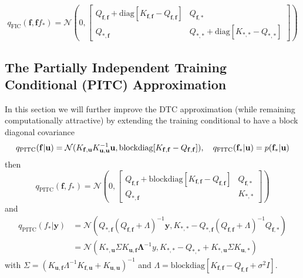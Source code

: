 \documentclass[10pt]{elegantbook}
\begin{document}
\begin{equation}
    q_{\text{FIC}}(\mathbf f, \mathbf f f_*) = \mathcal N \left ( 0, \begin{bmatrix}
        Q_{\mathbf f, \mathbf f} + \mathrm{diag} [K_{\mathbf f, \mathbf f} - Q_{\mathbf f, \mathbf f}] & Q_{\mathbf f, *} \\
        Q_{*, \mathbf f} & Q_{*, *} + \mathrm{diag} [K_{*, *} - Q_{*, *}]
    \end{bmatrix} \right )
\end{equation}

\subsection{The Partially Independent Training Conditional (PITC) Approximation}
In this section we will further improve the DTC approximation (while remaining computationally attractive) by
extending the training conditional to have a block diagonal covariance
\begin{equation}
    q_{\mathrm{PITC}}(\mathbf{f|u})
    =\mathcal{N}(K_{\mathbf{f,u}}K_{\mathbf{u,u}}^{-1}{\bf u}, \mathrm{blockdiag} [K_{\mathbf f, \mathbf f} - Q_{\mathbf f, \mathbf f}]),
    \quad q_{\mathrm{FITC}}(\mathbf{f_{*}}|{\bf u})=p(\mathbf{f_{*}}|{\bf u})
\end{equation}
then
\begin{equation}
    q_{\text{PITC}}(\mathbf f, f_*) = \mathcal N \left ( 0, \begin{bmatrix}
        Q_{\mathbf f, \mathbf f} + \mathrm{blockdiag} [K_{\mathbf f, \mathbf f} - Q_{\mathbf f, \mathbf f}] & Q_{\mathbf f, *} \\
        Q_{*, \mathbf f} & K_{*, *}
    \end{bmatrix} \right )
\end{equation}
and
\begin{equation}
    \begin{aligned}
    q_{\text{PITC}}(f_* | \mathbf y) &= \mathcal N \left (
        Q_{*, \mathbf f} (Q_{\mathbf f, \mathbf f} + \Lambda)^{-1} \mathbf y,
        K_{*, *} - Q_{*, \mathbf f} (Q_{\mathbf f, \mathbf f} + \Lambda)^{-1} Q_{\mathbf f, *}
        \right ) \\
        &= \mathcal N \left (
            K_{*, \mathbf u} \Sigma K_{\mathbf u, \mathbf f} \mathbf \Lambda^{-1} y,
            K_{*, *} - Q_{*, *} + K_{*, \mathbf u} \Sigma K_{\mathbf u, *}
            \right )
    \end{aligned}
\end{equation}
with $\Sigma = (K_{\mathbf u, \mathbf f} \Lambda^{-1} K_{\mathbf f, \mathbf u} + K_{\mathbf u, \mathbf u})^{-1}$ and 
$\Lambda = \mathrm{blockdiag} [K_{\mathbf f, \mathbf f} - Q_{\mathbf f, \mathbf f} + \sigma^2 I]$.
\end{document}
